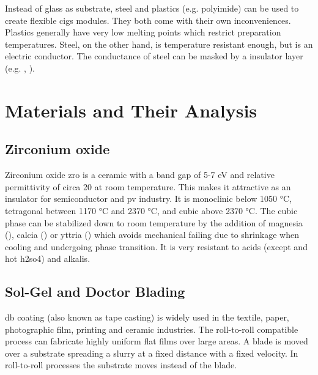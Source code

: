 %
Instead of glass as substrate, steel and plastics (e.g. polyimide\cite{feurer2017cigs}) can be used to create flexible \gls{cigs} modules. 
They both come with their own inconveniences. 
Plastics generally have very low melting points which restrict preparation temperatures.
Steel, on the other hand, is temperature resistant enough, but is an electric conductor. 
The conductance of steel can be masked by a insulator layer (e.g. , ).

\pagebreak[4]
\section{Materials and Their Analysis}
\subsection{Zirconium oxide}
Zirconium oxide \gls{zro} is a ceramic with a band gap of 5-7 eV\cite{Anwar2017} and relative permittivity of circa 20 at room temperature\cite{kukli2001dielectric}. 
This makes it attractive as an insulator for semiconductor and \gls{pv} industry. 
It is monoclinic below 1050 °C, tetragonal between 1170 °C and 2370 °C, and cubic above 2370 °C\cite{Nielsen2005}.
The cubic phase can be stabilized down to room temperature by the addition of magnesia (), calcia () or yttria () which avoids mechanical failing due to shrinkage 
when cooling and undergoing phase transition\cite{Nielsen2005}.
It is very resistant to acids (except  and hot \gls{h2so4}) and alkalis\cite{Nielsen2005}.

\subsection{Sol-Gel and Doctor Blading}
%
\Gls{db} coating (also known as tape casting) is widely used in the textile, paper, photographic film, printing and ceramic industries.
The roll-to-roll compatible process can fabricate highly uniform flat films over large areas\cite{yang2010large}.
A blade is moved over a substrate spreading a slurry at a fixed distance with a fixed velocity.
In roll-to-roll processes the substrate moves instead of the blade. 

